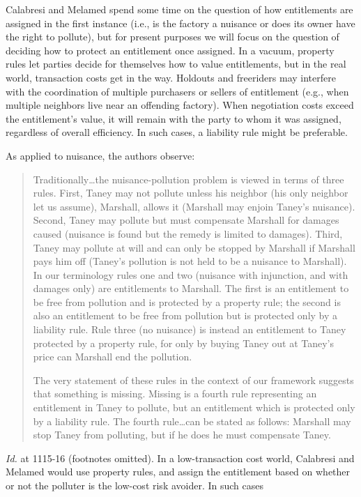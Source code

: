 Calabresi and Melamed spend some time on the question of how entitlements are
assigned in the first instance (i.e., is the factory a nuisance or does its
owner have the right to pollute), but for present purposes we will focus on the
question of deciding how to protect an entitlement once assigned. In a vacuum,
property rules let parties decide for themselves how to value entitlements, but
in the real world, transaction costs get in the way. Holdouts and freeriders may
interfere with the coordination of multiple purchasers or sellers of entitlement
(e.g., when multiple neighbors live near an offending factory). When negotiation
costs exceed the entitlement's value, it will remain with the party to whom it
was assigned, regardless of overall efficiency. In such cases, a liability rule
might be preferable. 

As applied to nuisance, the authors observe:
\begin{quotation}
Traditionally\ldots the nuisance-pollution problem is viewed in terms of three
rules. First, Taney may not pollute unless his neighbor (his only neighbor let
us assume), Marshall, allows it (Marshall may enjoin Taney's nuisance). Second,
Taney may pollute but must compensate Marshall for damages caused (nuisance is
found but the remedy is limited to damages). Third, Taney may pollute at will
and can only be stopped by Marshall if Marshall pays him off (Taney's pollution
is not held to be a nuisance to Marshall). In our terminology rules one and two
(nuisance with injunction, and with damages only) are entitlements to Marshall.
The first is an entitlement to be free from pollution and is protected by a
property rule; the second is also an entitlement to be free from pollution but
is protected only by a liability rule. Rule three (no nuisance) is instead an
entitlement to Taney protected by a property rule, for only by buying Taney out
at Taney's price can Marshall end the pollution.

The very statement of these rules in the context of our framework suggests that
something is missing. Missing is a fourth rule representing an entitlement in
Taney to pollute, but an entitlement which is protected only by a liability
rule. The fourth rule\ldots can be stated as follows: Marshall may stop Taney
from polluting, but if he does he must compensate Taney.
\end{quotation}
\textit{Id.} at 1115-16 (footnotes omitted). In a low-transaction cost world,
Calabresi and Melamed would use property rules, and assign the entitlement based
on whether or not the polluter is the low-cost risk avoider. In such cases
